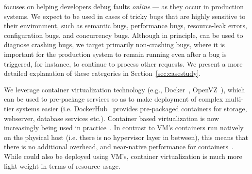 \parikshan focuses on helping developers debug faults \emph{online} --- as they occur in production systems.
We expect \parikshan to be used in cases of tricky bugs that are highly sensitive to their environment, such as semantic bugs, performance bugs, resource-leak errors, configuration bugs, and concurrency bugs.
Although in principle, \parikshan can be used to diagnose crashing bugs, we target primarily non-crashing bugs, where it is important for the production system to remain running even after a bug is triggered, for instance, to continue to process other requests. 
We present a more detailed explanation of these categories in Section~\ref{sec:casestudy}.

We leverage container virtualization technology (e.g., Docker~\cite{docker}, OpenVZ~\cite{openvz}), which can be used to pre-package services so as to make deployment of complex multi-tier systems easier (i.e. DockerHub~\cite{dockerhub,dockerhub_article} provides pre-packaged containers for storage, webserver, database services etc.).
Container based virtualization is now increasingly being used in practice~\cite{containerCloud}.
In contrast to VM's containers run natively on the physical host (i.e. there is no hypervisor layer in between), this means that there is no additional overhead, and near-native performance for containers~\cite{performanceComparisonlxcVM,performanceEvalContainers}.
While \parikshan could also be deployed using VM's, container virtualization is much more light weight in terms of resource usage.



